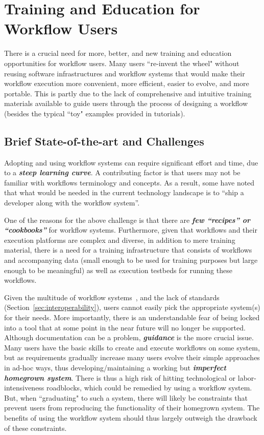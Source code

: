 \section{Training and Education for Workflow Users}
\label{sec:training}

There is a crucial need for more, better, and new training and education opportunities for workflow users. Many users ``re-invent the wheel" without reusing software infrastructures and workflow systems that would make their workflow execution more convenient, more efficient, easier to evolve, and more portable. This is partly due to the lack of comprehensive and intuitive training materials available to guide users through the process of designing a workflow (besides the typical ``toy" examples provided in tutorials).


\subsection{Brief State-of-the-art and Challenges}

Adopting and using workflow systems can require significant effort and time, due to a \textbf{\emph{steep learning curve}}. A contributing factor is that users may not be familiar with workflows terminology and concepts. As a result, some have noted that what would be needed in the current technology landscape is to ``ship a developer along with the workflow system''.

One of the reasons for the above challenge is that there are \textbf{\emph{few ``recipes'' or ``cookbooks''}} for workflow systems. Furthermore, given that workflows and their execution platforms are complex and diverse, in addition to mere training material, there is a need for a training infrastructure that consists of workflows and accompanying data (small enough to be used for training purposes but large enough to be meaningful) as well as execution testbeds for running these workflows.

Given the multitude of workflow systems~\cite{workflow-systems}, and the lack of standards (Section~\ref{sec:interoperability}), users cannot easily pick the appropriate system(s) for their needs. More importantly, there is an understandable fear of being locked into a tool that at some point in the near future will no longer be supported. Although documentation can be a problem, \textbf{\emph{guidance}} is the more crucial issue. Many users have the basic skills to create and execute workflows on some system, but as requirements gradually increase many users evolve their simple approaches in ad-hoc ways, thus developing/maintaining a working but \textbf{\emph{imperfect homegrown system}}. There is thus a high risk of hitting technological or labor-intensiveness roadblocks, which could be remedied by using a workflow system. But, when ``graduating" to such a system, there will likely be constraints that prevent users from reproducing the functionality of their homegrown system. The benefits of using the workflow system should thus largely outweigh the drawback of these constraints.

